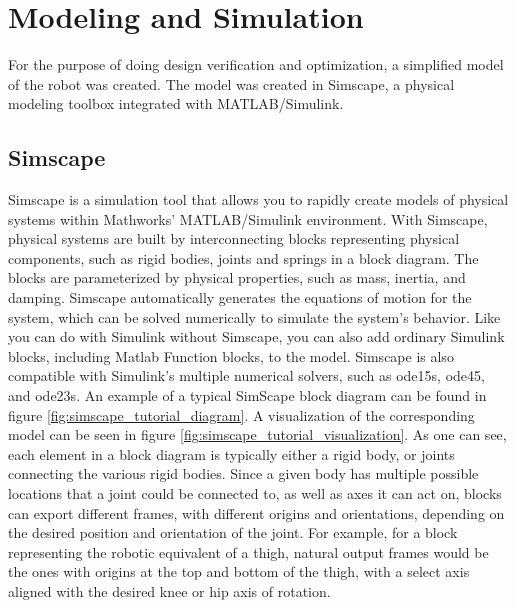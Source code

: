 \section{Modeling and Simulation}
\label{sec:modeling_and_simulation}
For the purpose of doing design verification and optimization, a simplified model of the robot was created. The model was created in Simscape, a physical modeling toolbox integrated with MATLAB/Simulink. 

\subsection{Simscape}

Simscape \cite{simulink_simscape} is a simulation tool that allows you to rapidly create models of physical systems within Mathworks' MATLAB/Simulink environment. With Simscape, physical systems are built by interconnecting blocks representing physical components, such as rigid bodies, joints and springs in a block diagram. The blocks are parameterized by physical properties, such as mass, inertia, and damping. Simscape automatically generates the equations of motion for the system, which can be solved numerically to simulate the system's behavior. Like you can do with Simulink without Simscape, you can also add ordinary Simulink blocks, including Matlab Function blocks, to the model. Simscape is also compatible with Simulink's multiple numerical solvers, such as ode15s, ode45, and ode23s. 
An example of a typical SimScape block diagram can be found in figure \ref{fig:simscape_tutorial_diagram}. A visualization of the corresponding model can be seen in figure \ref{fig:simscape_tutorial_visualization}. As one can see, each element in a block diagram is typically either a rigid body, or joints connecting the various rigid bodies. Since a given body has multiple possible locations that a joint could be connected to, as well as axes it can act on, blocks can export different frames, with different origins and orientations, depending on the desired position and orientation of the joint. For example, for a block representing the robotic equivalent of a thigh, natural output frames would be the ones with origins at the top and bottom of the thigh, with a select axis aligned with the desired knee or hip axis of rotation. 

